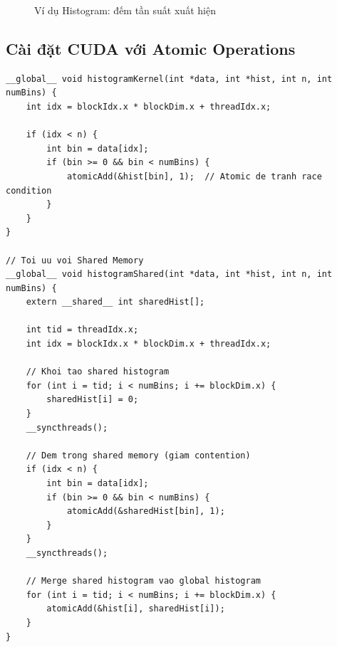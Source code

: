 \begin{figure}[H]
\centering
{}
\caption{Ví dụ Histogram: đếm tần suất xuất hiện}
\label{fig:histogram_example}
\end{figure}

\subsection{Cài đặt CUDA với Atomic Operations}

\begin{lstlisting}[caption={Histogram Kernel với atomicAdd}, label={lst:histogram_kernel}]
__global__ void histogramKernel(int *data, int *hist, int n, int numBins) {
    int idx = blockIdx.x * blockDim.x + threadIdx.x;
    
    if (idx < n) {
        int bin = data[idx];
        if (bin >= 0 && bin < numBins) {
            atomicAdd(&hist[bin], 1);  // Atomic de tranh race condition
        }
    }
}

// Toi uu voi Shared Memory
__global__ void histogramShared(int *data, int *hist, int n, int numBins) {
    extern __shared__ int sharedHist[];
    
    int tid = threadIdx.x;
    int idx = blockIdx.x * blockDim.x + threadIdx.x;
    
    // Khoi tao shared histogram
    for (int i = tid; i < numBins; i += blockDim.x) {
        sharedHist[i] = 0;
    }
    __syncthreads();
    
    // Dem trong shared memory (giam contention)
    if (idx < n) {
        int bin = data[idx];
        if (bin >= 0 && bin < numBins) {
            atomicAdd(&sharedHist[bin], 1);
        }
    }
    __syncthreads();
    
    // Merge shared histogram vao global histogram
    for (int i = tid; i < numBins; i += blockDim.x) {
        atomicAdd(&hist[i], sharedHist[i]);
    }
}
\end{lstlisting}

